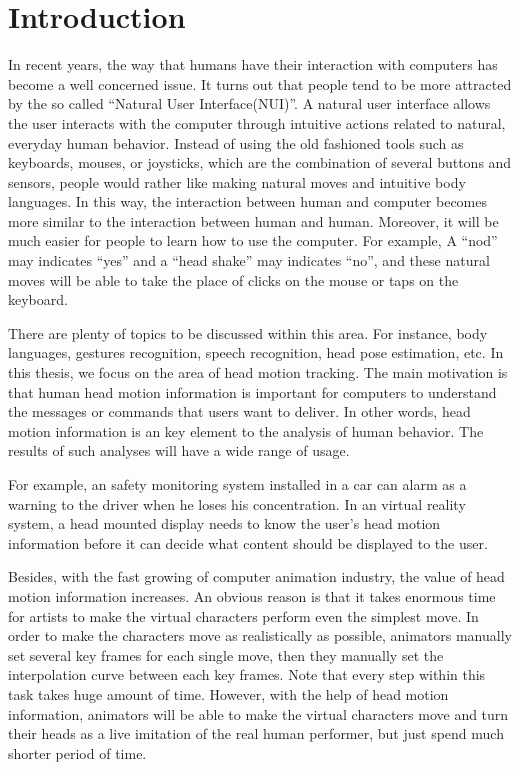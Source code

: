 \chapter{Introduction}
\label{c:intro}
In recent years, the way that humans have their interaction with computers has become a well concerned issue. It turns out that people tend to be more attracted by the so called ``Natural User Interface(NUI)''. A natural user interface allows the user interacts with the computer through intuitive actions related to natural, everyday human behavior. Instead of using the old fashioned tools such as keyboards, mouses, or joysticks, which are the combination of several buttons and sensors, people would rather like making natural moves and intuitive body languages. In this way, the interaction between human and computer becomes more similar to the interaction between human and human. Moreover, it will be much easier for people to learn how to use the computer. For example, A ``nod'' may indicates ``yes'' and a ``head shake'' may indicates ``no'', and these natural moves will be able to take the place of clicks on the mouse or taps on the keyboard.

There are plenty of topics to be discussed within this area. For instance, body languages, gestures recognition, speech recognition, head pose estimation, etc. In this thesis, we focus on the area of head motion tracking. The main motivation is that human head motion information is important for computers to understand the messages or commands that users want to deliver. In other words, head motion information is an key element to the analysis of human behavior. The  results of such analyses will have a wide range of usage.

For example, an safety monitoring system installed in a car can alarm as a warning to the driver when he loses his concentration. In an virtual reality system, a head mounted display needs to know the user's head motion information before it can decide what content should be displayed to the user. 

Besides, with the fast growing of computer animation industry, the value of head motion information increases. An obvious reason is that it takes enormous time for artists to make the virtual characters perform even the simplest move. In order to make the characters move as realistically as possible, animators manually set several key frames for each single move, then they manually set the interpolation curve between each key frames. Note that every step within this task takes huge amount of time. However, with the help of head motion information, animators will be able to make the virtual characters move and turn their heads as a live imitation of the real human performer, but just spend much shorter period of time. 

